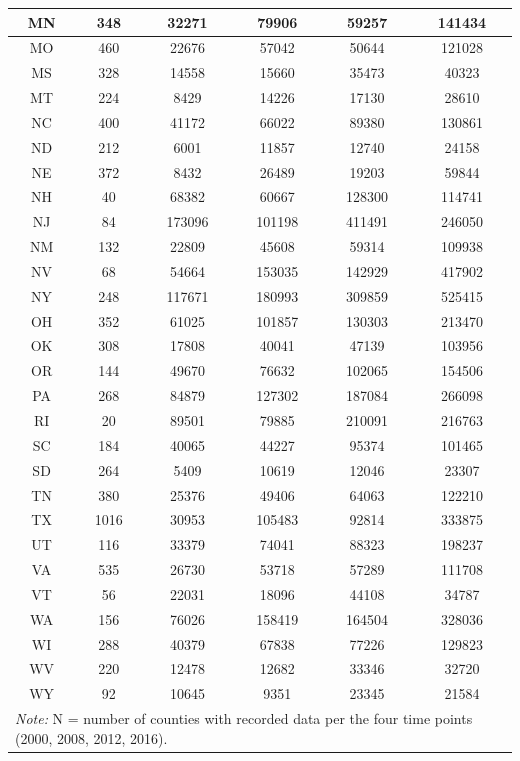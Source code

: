 \documentclass[
  english,
  man]{apa6}
\begin{document}
\begin{table}
\begin{tabular}[t]{c|c|c|c|c|c}
\hline
MN & 348 & 32271 & 79906 & 59257 & 141434\\
\hline
MO & 460 & 22676 & 57042 & 50644 & 121028\\
\hline
MS & 328 & 14558 & 15660 & 35473 & 40323\\
\hline
MT & 224 & 8429 & 14226 & 17130 & 28610\\
\hline
NC & 400 & 41172 & 66022 & 89380 & 130861\\
\hline
ND & 212 & 6001 & 11857 & 12740 & 24158\\
\hline
NE & 372 & 8432 & 26489 & 19203 & 59844\\
\hline
NH & 40 & 68382 & 60667 & 128300 & 114741\\
\hline
NJ & 84 & 173096 & 101198 & 411491 & 246050\\
\hline
NM & 132 & 22809 & 45608 & 59314 & 109938\\
\hline
NV & 68 & 54664 & 153035 & 142929 & 417902\\
\hline
NY & 248 & 117671 & 180993 & 309859 & 525415\\
\hline
OH & 352 & 61025 & 101857 & 130303 & 213470\\
\hline
OK & 308 & 17808 & 40041 & 47139 & 103956\\
\hline
OR & 144 & 49670 & 76632 & 102065 & 154506\\
\hline
PA & 268 & 84879 & 127302 & 187084 & 266098\\
\hline
RI & 20 & 89501 & 79885 & 210091 & 216763\\
\hline
SC & 184 & 40065 & 44227 & 95374 & 101465\\
\hline
SD & 264 & 5409 & 10619 & 12046 & 23307\\
\hline
TN & 380 & 25376 & 49406 & 64063 & 122210\\
\hline
TX & 1016 & 30953 & 105483 & 92814 & 333875\\
\hline
UT & 116 & 33379 & 74041 & 88323 & 198237\\
\hline
VA & 535 & 26730 & 53718 & 57289 & 111708\\
\hline
VT & 56 & 22031 & 18096 & 44108 & 34787\\
\hline
WA & 156 & 76026 & 158419 & 164504 & 328036\\
\hline
WI & 288 & 40379 & 67838 & 77226 & 129823\\
\hline
WV & 220 & 12478 & 12682 & 33346 & 32720\\
\hline
WY & 92 & 10645 & 9351 & 23345 & 21584\\
\hline
\multicolumn{6}{l}{\rule{0pt}{1em}\textit{Note: } N = number of counties with recorded data per the four time points (2000, 2008, 2012, 2016).}\\
\end{tabular}
\end{table}
\end{document}
